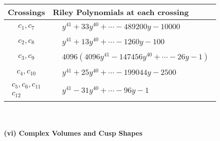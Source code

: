 \documentclass[1p]{elsarticle_modified}
\theoremstyle{definition}
\begin{document}
\begin{tabular}{m{50pt}|m{274pt}}
Crossings & \hspace{64pt}Riley Polynomials at each crossing \\
\hline $$\begin{aligned}c_{1},c_{7}\end{aligned}$$&$\begin{aligned}
&y^{41}+33 y^{40}+\cdots-489200 y-10000
\end{aligned}$\\
\hline $$\begin{aligned}c_{2},c_{8}\end{aligned}$$&$\begin{aligned}
&y^{41}+13 y^{40}+\cdots-1260 y-100
\end{aligned}$\\
\hline $$\begin{aligned}c_{3},c_{9}\end{aligned}$$&$\begin{aligned}
&4096(4096 y^{41}-147456 y^{40}+\cdots-26 y-1)
\end{aligned}$\\
\hline $$\begin{aligned}c_{4},c_{10}\end{aligned}$$&$\begin{aligned}
&y^{41}+25 y^{40}+\cdots-199044 y-2500
\end{aligned}$\\
\hline $$\begin{aligned}c_{5},c_{6},c_{11}\\c_{12}\end{aligned}$$&$\begin{aligned}
&y^{41}-31 y^{40}+\cdots-96 y-1
\end{aligned}$\\
\hline
\end{tabular}\\~\\
\newpage\flushleft \textbf{(vi) Complex Volumes and Cusp Shapes}
\end{document}

